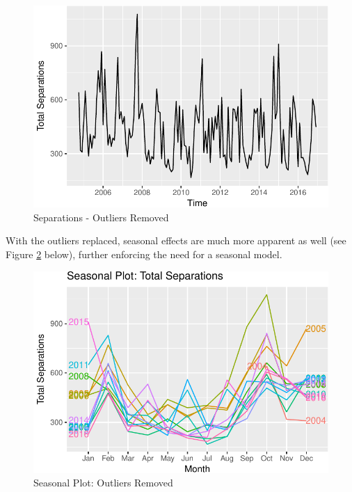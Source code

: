 \documentclass[12pt,letterpaper,toc=flat,oneside]{report}
\theoremstyle{definition}
\theoremstyle{definition}
\theoremstyle{definition}
\theoremstyle{remark}
\begin{document}
\begin{figure}[H]

{\centering \includegraphics{elliott-econometric-personnel-retention-18_files/figure-latex/response-plot-2-1} 

}

\caption{Separations - Outliers Removed}\label{fig:response-plot-2}
\end{figure}

With the outliers replaced, seasonal effects are much more apparent as
well (see Figure \ref{fig:response-season-plot-2} below), further
enforcing the need for a seasonal model.

\begin{figure}[H]

{\centering \includegraphics{elliott-econometric-personnel-retention-18_files/figure-latex/response-season-plot-2-1} 

}

\caption{Seasonal Plot: Outliers Removed}\label{fig:response-season-plot-2}
\end{figure}
\end{document}
